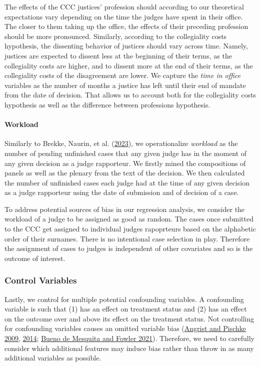 \documentclass[
  11pt,
]{article}
\begin{document}
The effects of the CCC justices' profession should according to our
theoretical expectations vary depending on the time the judges have
spent in their office. The closer to them taking up the office, the
effects of their preceding profession should be more pronounced.
Similarly, according to the collegiality costs hypothesis, the
dissenting behavior of justices should vary across time. Namely,
justices are expected to dissent less at the beginning of their terms,
as the collegiality costs are higher, and to dissent more at the end of
their terms, as the collegiality costs of the disagreement are lower. We
capture the \emph{time in office} variables as the number of months a
justice has left until their end of mandate from the date of decision.
That allows us to account both for the collegiality costs hypothesis as
well as the difference between professions hypothesis.

\hypertarget{workload}{%
\paragraph{Workload}\label{workload}}

Similarly to Brekke, Naurin, et al.
(\protect\hyperlink{ref-brekkeThatOrderHow2023}{2023}), we
operationalize \emph{workload} as the number of pending unfinished cases
that any given judge has in the moment of any given decision as a judge
rapporteur. We firstly mined the compositions of panels as well as the
plenary from the text of the decision. We then calculated the number of
unfinished cases each judge had at the time of any given decision as a
judge rapporteur using the date of submission and of decision of a case.

To address potential sources of bias in our regression analysis, we
consider the workload of a judge to be assigned as good as random. The
cases once submitted to the CCC get assigned to individual judges
rapoprteurs based on the alphabetic order of their surnames. There is no
intentional case selection in play. Therefore the assignment of cases to
judges is independent of other covariates and so is the outcome of
interest.

\hypertarget{control-variables}{%
\subsubsection{Control Variables}\label{control-variables}}

Lastly, we control for multiple potential confounding variables. A
confounding variable is such that (1) has an effect on treatment status
and (2) has an effect on the outcome over and above its effect on the
treatment status. Not controlling for confounding variables causes an
omitted variable bias
(\protect\hyperlink{ref-angristMostlyHarmlessEconometrics2009}{Angrist
and Pischke 2009},
\protect\hyperlink{ref-angristMasteringMetricsPath2014}{2014};
\protect\hyperlink{ref-buenodemesquitaThinkingClearlyData2021}{Bueno de
Mesquita and Fowler 2021}). Therefore, we need to carefully consider
which additional features may induce bias rather than throw in as many
additional variables as possible.
\end{document}
